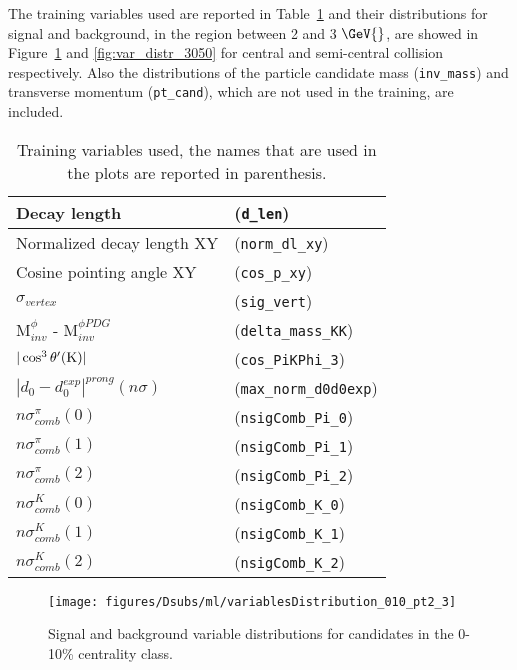 The training variables used are reported in Table~\ref{tab:train_var} and their distributions for signal and background, 
in the \pt{} region between 2 and 3 \(\GeV{}\), are showed in Figure~\ref{fig:var_distr_010} and \ref{fig:var_distr_3050}
for central and semi-central collision respectively. Also the distributions of the particle candidate mass (\texttt{inv\_mass}) 
and transverse momentum (\texttt{pt\_cand}), which are not used in the training, are included.
\begin{table}[htpb]
  \begin{center}
  \caption{Training variables used, the names that are used in the plots are reported in parenthesis.}
  \label{tab:train_var}
    \begin{tabular}{|l|l|}
      \hline
      Decay length & (\texttt{d\_len}) \\
			\hline
			Normalized decay length XY & (\texttt{norm\_dl\_xy}) \\
			\hline
			Cosine pointing angle XY & (\texttt{cos\_p\_xy}) \\
			\hline
			$\sigma_{vertex}$ & (\texttt{sig\_vert}) \\
			\hline
			M$^{\phi}_{inv}$ - M$^{\phi PDG}_{inv}$ & (\texttt{delta\_mass\_KK}) \\
			\hline
			$|\cos^3 \theta^\prime({\rm K})|$ & (\texttt{cos\_PiKPhi\_3}) \\
			\hline
			$|d_0-d_0^{exp}|^{prong}(n\sigma)$ & (\texttt{max\_norm\_d0d0exp}) \\
      \hline
      $n\sigma_{comb}^{\pi}(0)$ & (\texttt{nsigComb\_Pi\_0})\\
      \hline
      $n\sigma_{comb}^{\pi}(1)$ & (\texttt{nsigComb\_Pi\_1})\\
      \hline
      $n\sigma_{comb}^{\pi}(2)$ & (\texttt{nsigComb\_Pi\_2})\\
      \hline
      $n\sigma_{comb}^{K}(0)$ & (\texttt{nsigComb\_K\_0})\\
      \hline
      $n\sigma_{comb}^{K}(1)$ & (\texttt{nsigComb\_K\_1})\\
      \hline
      $n\sigma_{comb}^{K}(2)$ & (\texttt{nsigComb\_K\_2})\\
      \hline
    \end{tabular}
  \end{center}
\end{table}
\begin{figure}[htpb]
  \begin{center}
   \texttt{[image: figures/Dsubs/ml/variablesDistribution\_010\_pt2\_3]}
   \caption{Signal and background variable distributions for candidates in the 0-10\% centrality class.}
  \label{fig:var_distr_010}
  \end{center}
\end{figure}
